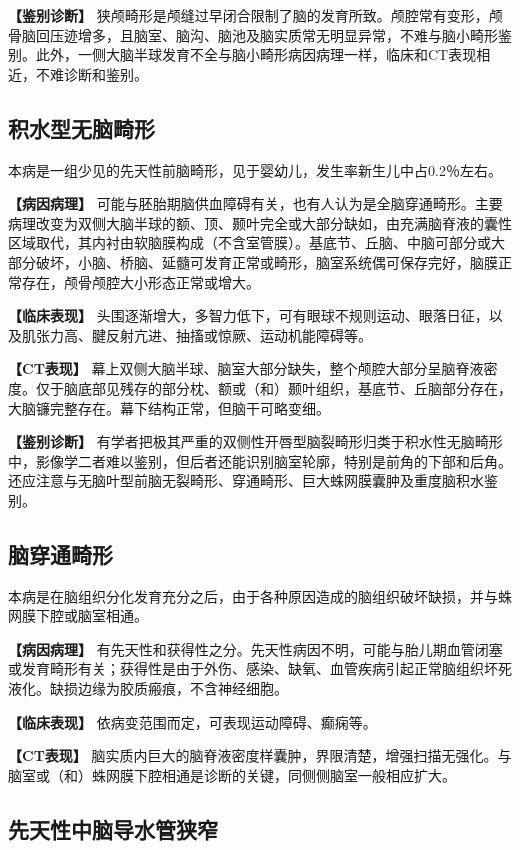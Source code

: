 \textbf{【鉴别诊断】}
狭颅畸形是颅缝过早闭合限制了脑的发育所致。颅腔常有变形，颅骨脑回压迹增多，且脑室、脑沟、脑池及脑实质常无明显异常，不难与脑小畸形鉴别。此外，一侧大脑半球发育不全与脑小畸形病因病理一样，临床和CT表现相近，不难诊断和鉴别。

\subsection{积水型无脑畸形}

本病是一组少见的先天性前脑畸形，见于婴幼儿，发生率新生儿中占0.2％左右。

\textbf{【病因病理】}
可能与胚胎期脑供血障碍有关，也有人认为是全脑穿通畸形。主要病理改变为双侧大脑半球的额、顶、颞叶完全或大部分缺如，由充满脑脊液的囊性区域取代，其内衬由软脑膜构成（不含室管膜）。基底节、丘脑、中脑可部分或大部分破坏，小脑、桥脑、延髓可发育正常或畸形，脑室系统偶可保存完好，脑膜正常存在，颅骨颅腔大小形态正常或增大。

\textbf{【临床表现】}
头围逐渐增大，多智力低下，可有眼球不规则运动、眼落日征，以及肌张力高、腱反射亢进、抽搐或惊厥、运动机能障碍等。

\textbf{【CT表现】}
幕上双侧大脑半球、脑室大部分缺失，整个颅腔大部分呈脑脊液密度。仅于脑底部见残存的部分枕、额或（和）颞叶组织，基底节、丘脑部分存在，大脑镰完整存在。幕下结构正常，但脑干可略变细。

\textbf{【鉴别诊断】}
有学者把极其严重的双侧性开唇型脑裂畸形归类于积水性无脑畸形中，影像学二者难以鉴别，但后者还能识别脑室轮廓，特别是前角的下部和后角。还应注意与无脑叶型前脑无裂畸形、穿通畸形、巨大蛛网膜囊肿及重度脑积水鉴别。

\subsection{脑穿通畸形}

本病是在脑组织分化发育充分之后，由于各种原因造成的脑组织破坏缺损，并与蛛网膜下腔或脑室相通。

\textbf{【病因病理】}
有先天性和获得性之分。先天性病因不明，可能与胎儿期血管闭塞或发育畸形有关；获得性是由于外伤、感染、缺氧、血管疾病引起正常脑组织坏死液化。缺损边缘为胶质瘢痕，不含神经细胞。

\textbf{【临床表现】} 依病变范围而定，可表现运动障碍、癫痫等。

\textbf{【CT表现】}
脑实质内巨大的脑脊液密度样囊肿，界限清楚，增强扫描无强化。与脑室或（和）蛛网膜下腔相通是诊断的关键，同侧侧脑室一般相应扩大。

\subsection{先天性中脑导水管狭窄}

